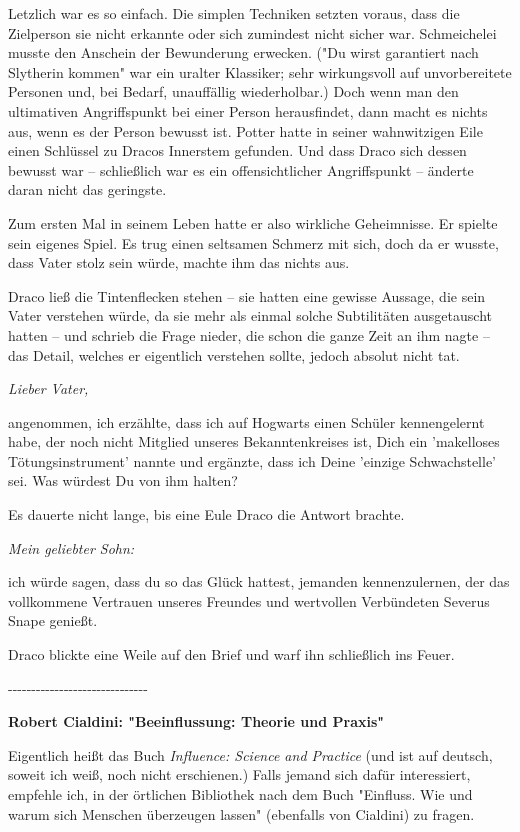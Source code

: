 {Letzlich war es so einfach. Die simplen Techniken setzten voraus, dass die Zielperson sie nicht erkannte oder sich zumindest nicht sicher war. Schmeichelei musste den Anschein der Bewunderung erwecken. ("Du wirst garantiert nach Slytherin kommen" war ein uralter Klassiker; sehr wirkungsvoll auf unvorbereitete Personen und, bei Bedarf, unauffällig wiederholbar.) Doch wenn man den ultimativen Angriffspunkt bei einer Person herausfindet, dann macht es nichts aus, wenn es der Person bewusst ist. Potter hatte in seiner wahnwitzigen Eile einen Schlüssel zu Dracos Innerstem gefunden. Und dass Draco sich dessen bewusst war -- schließlich war es ein offensichtlicher Angriffspunkt -- änderte daran nicht das geringste.

Zum ersten Mal in seinem Leben hatte er also wirkliche Geheimnisse. Er spielte sein eigenes Spiel. Es trug einen seltsamen Schmerz mit sich, doch da er wusste, dass Vater stolz sein würde, machte ihm das nichts aus.

Draco ließ die Tintenflecken stehen -- sie hatten eine gewisse Aussage, die sein Vater verstehen würde, da sie mehr als einmal solche Subtilitäten ausgetauscht hatten -- und schrieb die Frage nieder, die schon die ganze Zeit an ihm nagte -- das Detail, welches er eigentlich verstehen sollte, jedoch absolut nicht tat.

\emph{Lieber Vater,}

angenommen, ich erzählte, dass ich auf Hogwarts einen Schüler kennengelernt habe, der noch nicht Mitglied unseres Bekanntenkreises ist, Dich ein 'makelloses Tötungsinstrument' nannte und ergänzte, dass ich Deine 'einzige Schwachstelle' sei. Was würdest Du von ihm halten?

Es dauerte nicht lange, bis eine Eule Draco die Antwort brachte.

\emph{Mein geliebter Sohn:}

ich würde sagen, dass du so das Glück hattest, jemanden kennenzulernen, der das vollkommene Vertrauen unseres Freundes und wertvollen Verbündeten Severus Snape genießt.

Draco blickte eine Weile auf den Brief und warf ihn schließlich ins Feuer.

-\/-\/-\/-\/-\/-\/-\/-\/-\/-\/-\/-\/-\/-\/-\/-\/-\/-\/-\/-\/-\/-\/-\/-\/-\/-\/-\/-\/-\/-

\textbf{Robert Cialdini: "Beeinflussung: Theorie und Praxis"}

Eigentlich heißt das Buch \emph{Influence: Science and Practice} (und ist auf deutsch, soweit ich weiß, noch nicht erschienen.) Falls jemand sich dafür interessiert, empfehle ich, in der örtlichen Bibliothek nach dem Buch "Einfluss. Wie und warum sich Menschen überzeugen lassen" (ebenfalls von Cialdini) zu fragen.

}
